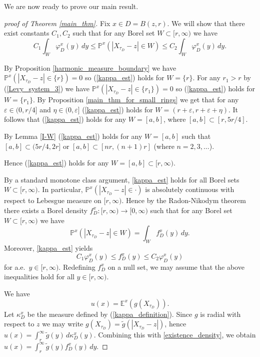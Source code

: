 \documentclass[a4paper,12pt,reqno]{amsart}
\theoremstyle{definition}
\theoremstyle{remark}
\newcommand{\eps}{\varepsilon}
\newcommand{\Ee}{\mathds{E}} %
\newcommand{\Pp}{\mathds{P}} %
\begin{document}
We are now ready to prove our main result.
\begin{proof}[proof of Theorem \ref{main_thm}]
Fix $x \in D = B(z,r)$. We will show that there exist constants $C_1, C_2$ such that for any Borel set $W \subset [r,\infty)$ we have
\begin{equation}
\label{kappa_est}
C_1 \int_W \varphi_D^x(y) \, dy \le \Pp^x(|X_{\tau_{D}} - z| \in W) \le C_2 \int_W \varphi_D^x(y) \, dy.
\end{equation}

By Proposition \ref{harmonic_measure_boundary} we have $\Pp^x(|X_{\tau_{D}} - z| \in \{r\}) = 0$ so (\ref{kappa_est}) holds for $W = \{r\}$. For any $r_1 > r$ by (\ref{Levy_system_3}) we have $\Pp^x(|X_{\tau_{D}} - z| \in \{r_1\}) = 0$ so (\ref{kappa_est}) holds for $W = \{r_1\}$.
By Proposition \ref{main_thm_for_small_rings} we get that for any $\eps \in (0,r/4]$ and $\eta \in (0,\eps]$  (\ref{kappa_est}) holds for $W = (r+\eps, r + \eps + \eta)$.
It follows that (\ref{kappa_est}) holds for any $W = [a,b]$, where $[a,b] \subset [r,5r/4]$.

By Lemma \ref{I-W} (\ref{kappa_est}) holds for any $W = [a,b]$ such that $[a,b] \subset (5r/4,2r]$ or $[a,b] \subset [nr,(n+1)r]$ (where $n = 2, 3, \ldots$). 

Hence (\ref{kappa_est}) holds for any $W = [a,b] \subset [r,\infty)$.

By a standard monotone class argument, \eqref{kappa_est} holds for all Borel sets $W\subset [r,\infty)$.
In particular, $\Pp^x(|X_{\tau_{D}} - z| \in \cdot)$ is absolutely continuous with respect to Lebesgue measure on $[r,\infty)$. Hence by the Radon-Nikodym theorem there exists a Borel density $f_D^x:[r,\infty) \to [0,\infty)$ such that for any Borel set $W \subset [r,\infty)$ we have
\begin{equation}
\label{existence_density}
\Pp^x(|X_{\tau_{D}} - z| \in W) = \int_W f_D^x(y) \, dy.
\end{equation}
Moreover, \eqref{kappa_est} yields 
\begin{equation*}
C_1 \varphi_D^x(y) \le f_D^x(y) \le C_2 \varphi_D^x(y)
\end{equation*}
for a.e.\ $y\in[r,\infty)$. Redefining $f_D^x$ on a null set, we may assume that the above inequalities hold for all $y\in[r,\infty)$.

We have 
$$
u(x) = \Ee^x(g(X_{\tau_{D}})).
$$
Let $\kappa_D^x$ be the measure defined by (\ref{kappa_definition}). Since $g$ is radial with respect to $z$ we may write $g(X_{\tau_D})=\tilde g(|X_{\tau_D}-z|)$, hence  $u(x) = \int_r^{\infty} \tilde{g}(y) \, d\kappa_D^x(y)$. Combining this with \eqref{existence_density}, we obtain $u(x) = \int_r^{\infty} \tilde{g}(y) f_D^x(y)\, dy$. 
\end{proof}
\end{document}

